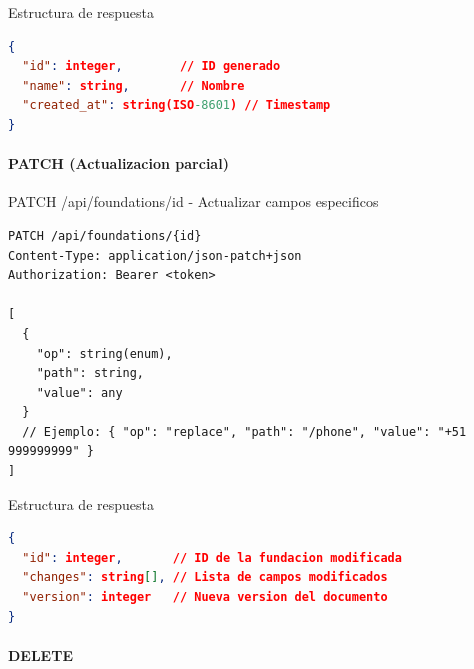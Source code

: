 \documentclass[11pt,a4paper]{article}
\begin{document}
\begin{center}
	\begin{minipage}{\textwidth}
		\begin{codebox}{Estructura de respuesta}
			\begin{lstlisting}[language=json]
{
  "id": integer,        // ID generado
  "name": string,       // Nombre
  "created_at": string(ISO-8601) // Timestamp
}
\end{lstlisting}
		\end{codebox}
	\end{minipage}
\end{center}

\paragraph{PATCH (Actualizacion parcial)}

\begin{center}
	\begin{minipage}{\textwidth}
		\begin{codebox}{PATCH /api/foundations/{id} - Actualizar campos especificos}
			\begin{lstlisting}[language=HTTP]
PATCH /api/foundations/{id}
Content-Type: application/json-patch+json
Authorization: Bearer <token>

[
  {
    "op": string(enum),
    "path": string,
    "value": any
  }
  // Ejemplo: { "op": "replace", "path": "/phone", "value": "+51 999999999" }
]
\end{lstlisting}
		\end{codebox}
	\end{minipage}
\end{center}

\begin{center}
	\begin{minipage}{\textwidth}
		\begin{codebox}{Estructura de respuesta}
			\begin{lstlisting}[language=json]
{
  "id": integer,       // ID de la fundacion modificada
  "changes": string[], // Lista de campos modificados
  "version": integer   // Nueva version del documento
}
\end{lstlisting}
		\end{codebox}
	\end{minipage}
\end{center}

\paragraph{DELETE}
\end{document}
